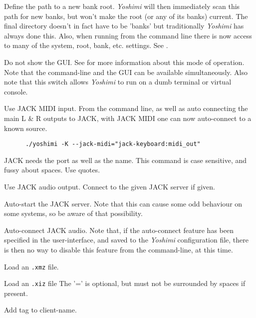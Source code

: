       Define the path to a new bank root.
      \textsl{Yoshimi} will then immediately scan this path for new banks,
      but won't make the root (or any of its banks) current. The final
      directory doesn't in fact have to be 'banks' but traditionally
      \textsl{Yoshimi} has always done this.
      Also, when running from the command line there is now access to many of
      the system, root, bank, etc. settings.
      See .

      Do not show the GUI.  See  for more
      information about this mode of operation.  Note that the command-line
      and the GUI can be available simultaneously.  Also note that this
      switch allows \textsl{Yoshimi} to run on a dumb terminal or virtual
      console.

      Use JACK MIDI input.
      From the command line, as well as auto connecting the main L \& R
      outputs to JACK, with JACK MIDI one can now auto-connect to a known source.

   \begin{verbatim}
      ./yoshimi -K --jack-midi="jack-keyboard:midi_out"
   \end{verbatim}

   JACK needs the port as well as the name.
   This command is case sensitive, and fussy about spaces.
   Use quotes.

      Use JACK audio output.
      Connect to the given JACK server if given.

      Auto-start the JACK server.
      Note that this can cause some odd behaviour on some systems, so be aware of
      that possibility.

      Auto-connect JACK audio.  Note that, if the auto-connect feature has been
      specified in the user-interface, and saved to the \textsl{Yoshimi}
      configuration file, there is then no way to disable this feature from the
      command-line, at this time.

      Load an \texttt{.xmz} file.

      Load an \texttt{.xiz} file  The '=' is optional, but must not be
      surrounded by spaces if present.

      Add tag to client-name.

